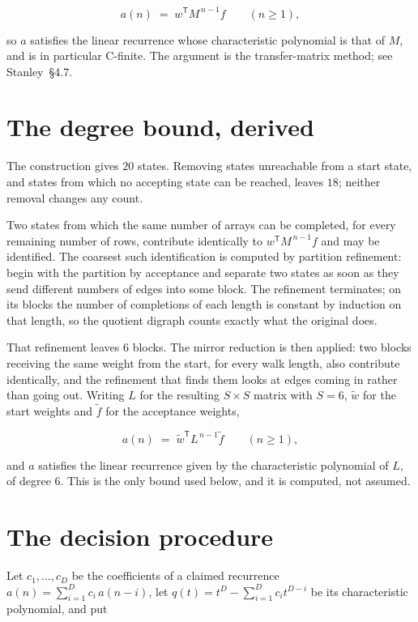 \documentclass[11pt]{article}
\theoremstyle{definition}
\begin{document}
\[a(n) \;=\; w^{\mathsf T} M^{\,n-1} f \qquad (n \ge 1),\]

so $a$ satisfies the linear recurrence whose characteristic polynomial is that of $M$, and is in particular C-finite. The argument is the transfer-matrix method; see Stanley~\S4.7.

\section{The degree bound, derived}

The construction gives $20$ states. Removing states unreachable from a start state, and states from which no accepting state can be reached, leaves $18$; neither removal changes any count.

Two states from which the same number of arrays can be completed, for every remaining number of rows, contribute identically to $w^{\mathsf T}M^{\,n-1}f$ and may be identified. The coarsest such identification is computed by partition refinement: begin with the partition by acceptance and separate two states as soon as they send different numbers of edges into some block. The refinement terminates; on its blocks the number of completions of each length is constant by induction on that length, so the quotient digraph counts exactly what the original does.

That refinement leaves $6$ blocks. The mirror reduction is then applied: two blocks receiving the same weight from the start, for every walk length, also contribute identically, and the refinement that finds them looks at edges coming in rather than going out. Writing $L$ for the resulting $S \times S$ matrix with $S = 6$, $\tilde w$ for the start weights and $\tilde f$ for the acceptance weights,

\[a(n) \;=\; \tilde w^{\mathsf T} L^{\,n-1} \tilde f \qquad (n \ge 1),\]

and $a$ satisfies the linear recurrence given by the characteristic polynomial of $L$, of degree $6$. This is the only bound used below, and it is computed, not assumed.

\section{The decision procedure}

Let $c_1,\dots,c_D$ be the coefficients of a claimed recurrence $a(n) = \sum_{i=1}^{D} c_i\,a(n-i)$, let $q(t) = t^{D} - \sum_{i=1}^{D} c_i t^{D-i}$ be its characteristic polynomial, and put
\end{document}
